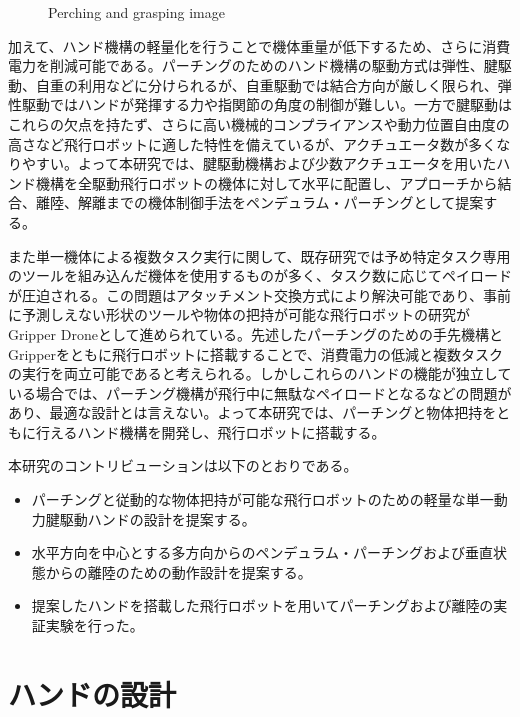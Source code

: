 \documentclass{jarticle}
\begin{document}
\begin{figure}[tb]
\begin{subfigure}{0.68\columnwidth}
    \vspace{-6mm}
    \caption{}
    \label{fig:pgimage}
  \end{subfigure}
  \vspace{2mm}
  \caption{Perching and grasping image}
  \vspace{-3mm}
\end{figure}

加えて、ハンド機構の軽量化を行うことで機体重量が低下するため、さらに消費電力を削減可能である。パーチングのためのハンド機構の駆動方式は弾性、腱駆動、自重の利用などに分けられるが、自重駆動では結合方向が厳しく限られ、弾性駆動ではハンドが発揮する力や指関節の角度の制御が難しい。一方で腱駆動はこれらの欠点を持たず、さらに高い機械的コンプライアンスや動力位置自由度の高さなど飛行ロボットに適した特性を備えているが、アクチュエータ数が多くなりやすい。よって本研究では、腱駆動機構および少数アクチュエータを用いたハンド機構を全駆動飛行ロボットの機体に対して水平に配置し、アプローチから結合、離陸、解離までの機体制御手法をペンデュラム・パーチングとして提案する。

また単一機体による複数タスク実行に関して、既存研究では予め特定タスク専用のツールを組み込んだ機体を使用するものが多く、タスク数に応じてペイロードが圧迫される。この問題はアタッチメント交換方式により解決可能であり、事前に予測しえない形状のツールや物体の把持が可能な飛行ロボットの研究がGripper Droneとして進められている。先述したパーチングのための手先機構とGripperをともに飛行ロボットに搭載することで、消費電力の低減と複数タスクの実行を両立可能であると考えられる。しかしこれらのハンドの機能が独立している場合では、パーチング機構が飛行中に無駄なペイロードとなるなどの問題があり、最適な設計とは言えない。よって本研究では、パーチングと物体把持をともに行えるハンド機構を開発し、飛行ロボットに搭載する。

本研究のコントリビューションは以下のとおりである。

\begin{itemize}
  \item パーチングと従動的な物体把持が可能な飛行ロボットのための軽量な単一動力腱駆動ハンドの設計を提案する。
  \item 水平方向を中心とする多方向からのペンデュラム・パーチングおよび垂直状態からの離陸のための動作設計を提案する。
  \item 提案したハンドを搭載した飛行ロボットを用いてパーチングおよび離陸の実証実験を行った。
\end{itemize}

\section{ハンドの設計}
\end{document}
